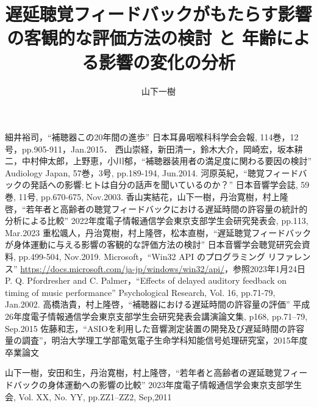 \documentclass[a4paper,12pt]{jsreport}
\title{遅延聴覚フィードバックがもたらす影響の客観的な評価方法の検討
と
年齢による影響の変化の分析}
\author{山下\hspace{1zw}一樹}%
\begin{document}
\makecover%
\tableofcontents%










\begin{thebibliography}{99}
	細井裕司，``補聴器この20年間の進歩'' 日本耳鼻咽喉科科学会会報, 114巻，12号，pp.905-911，Jan.2015．
  西山崇経，新田清一，鈴木大介，岡崎宏，坂本耕二，中村伸太郎，上野恵，小川郁，``補聴器装用者の満足度に関わる要因の検討'' Audiology Japan, 57巻，3号, pp.189-194, Jun.2014.
  河原英紀，``聴覚フィードバックの発話への影響:ヒトは自分の話声を聞いているのか？'' 日本音響学会誌, 59巻, 11号, pp.670-675, Nov.2003.
  香山実結花，山下一樹，丹治寛樹，村上隆啓，``若年者と高齢者の聴覚フィードバックにおける遅延時間の許容量の統計的分析による比較'' 2022年度電子情報通信学会東京支部学生会研究発表会, pp.113, Mar.2023
  重松颯人，丹治寛樹，村上隆啓，松本直樹，``遅延聴覚フィードバックが身体運動に与える影響の客観的な評価方法の検討'' 日本音響学会聴覚研究会資料, pp.499-504, Nov.2019.
  Microsoft，``Win32 API のプログラミング リファレンス'' \url{https://docs.microsoft.com/ja-jp/windows/win32/api/}，参照2023年1月24日
  P. Q. Pfordresher and C. Palmer，``Effects of delayed auditory feedback on timing of music performance'' Psychological Research, Vol. 16, pp.71-79, Jan.2002.
  高橋浩貴，村上隆啓，``補聴器における遅延時間の許容量の評価'' 平成26年度電子情報通信学会東京支部学生会研究発表会講演論文集, p168, pp.71--79, Sep.2015
  佐藤和志，``ASIOを利用した音響測定装置の開発及び遅延時間の許容量の調査''，明治大学理工学部電気電子生命学科知能信号処理研究室，2015年度卒業論文

\end{thebibliography}
\begin{thepublished}{99}
	山下一樹，安田和生，丹治寛樹，村上隆啓，``若年者と高齢者の遅延聴覚フィードバックの身体運動への影響の比較'' 2023年度電子情報通信学会東京支部学生会, Vol. XX, No. YY, pp.ZZ1--ZZ2, Sep,2011
	
\end{thepublished}
\newpage



\appendix

\end{document}
